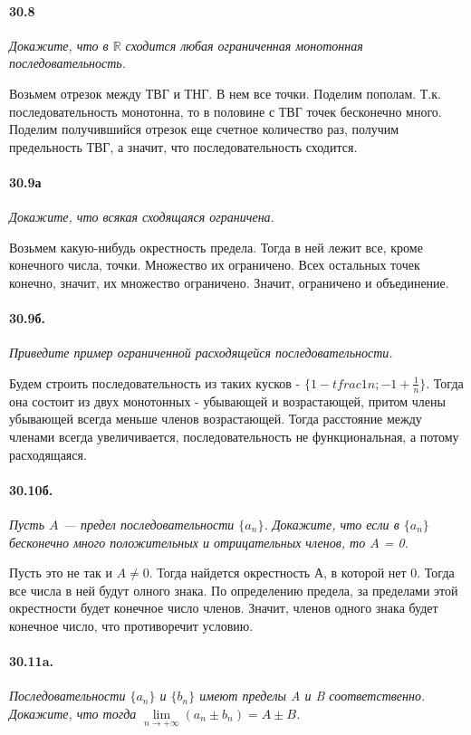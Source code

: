 \documentclass{book}
\begin{document}
\paragraph{30.8}
\textit{Докажите, что в $\mathbb{R}$ сходится любая ограниченная монотонная последовательность.}

Возьмем отрезок между ТВГ и ТНГ. В нем все точки. Поделим пополам. Т.к. последовательность монотонна, то в половине с ТВГ точек бесконечно много. Поделим получившийся отрезок еще счетное количество раз, получим предельность ТВГ, а значит, что последовательность сходится.


\paragraph{30.9а}
\textit{Докажите, что всякая сходящаяся ограничена.}

Возьмем какую-нибудь окрестность предела. Тогда в ней лежит все, кроме конечного числа, точки. Множество их ограничено. Всех остальных точек конечно, значит, их множество ограничено. Значит, ограничено и объединение.

\newpage

\paragraph{30.9б.}
\textit{Приведите пример ограниченной расходящейся последовательности.}

Будем строить последовательность из таких кусков - $\{1 - tfrac{1}{n}; -1 + \tfrac{1}{n}\}$. Тогда она состоит из двух монотонных - убывающей и возрастающей, притом члены убывающей всегда меньше членов возрастающей. Тогда расстояние между членами всегда увеличивается, последовательность не функциональная, а потому расходящаяся.

\paragraph{30.10б.}
\textit{Пусть $A$ — предел последовательности $\{a_n\}$. Докажите, что если
в $\{a_n\}$ бесконечно много положительных и отрицательных членов, то $A$ = 0.}

Пусть это не так и $A \neq 0$. Тогда найдется окрестность А, в которой нет 0. Тогда все числа в ней будут олного знака. По определению предела, за пределами этой окрестности будет конечное число членов. Значит, членов одного знака будет конечное число, что противоречит условию.


\paragraph{30.11a.}
\textit{Последовательности $\{a_n\}$ и $\{b_n\}$ имеют пределы A и B соответственно. Докажите, что тогда $\underset{n \to +\infty}{\lim} (a_n \pm b_n) = A \pm B$.}
\end{document}
